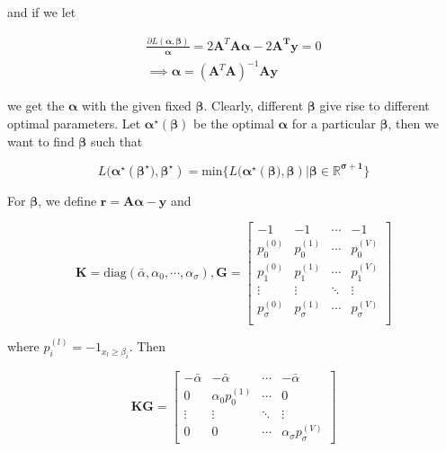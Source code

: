 and if we let 

\begin{equation}
\label{alpha_form}
	\begin{split}
		\frac{\partial L(\boldsymbol{\alpha}, \boldsymbol{\beta})}{\boldsymbol{\alpha}}=2\boldsymbol{A}^T\boldsymbol{A}\boldsymbol{\alpha}-2\boldsymbol{A^T}\boldsymbol{y}=0 \\ \implies 
		\boldsymbol{\alpha}=(\boldsymbol{A}^T\boldsymbol{A})^{-1}\boldsymbol{A}\boldsymbol{y}
	\end{split}
\end{equation}


we get the $\boldsymbol{\alpha}$ with the given fixed $\boldsymbol{\beta}$. Clearly, different $\boldsymbol{\beta}$ give rise to different optimal parameters. Let $\boldsymbol{\alpha^\star}(\boldsymbol{\beta})$ be the optimal $\boldsymbol{\alpha}$ for a particular $\boldsymbol{\beta}$, then we want to find $\boldsymbol{\beta}$ such that


\begin{equation}
	L(\boldsymbol{\alpha^\star}(\boldsymbol{\beta^\star)}, \boldsymbol{\beta^\star})=\text{min}\{L(\boldsymbol{\alpha^\star}(\boldsymbol{\beta)}, \boldsymbol{\beta}) | \boldsymbol{\beta\in\mathbb{R}^{\sigma+1}}\}
\end{equation}

For $\boldsymbol{\beta}$, we define $\boldsymbol{r}=\boldsymbol{A\alpha-y}$ and 

$$
\boldsymbol{K}=\text{diag}(\bar{\alpha},\alpha_0, \cdots, \alpha_\sigma), \boldsymbol{G}=\begin{bmatrix}
 -1 & -1 & \cdots & -1 \\
  p_0^{(0)} & p_0^{(1)} & \cdots & p_0^{(V)} \\
  p_1^{(0)} & p_1^{(1)} & \cdots & p_1^{(V)} \\
  \vdots & \vdots & \ddots & \vdots \\
  p_\sigma^{(0)} & p_\sigma^{(1)}& \cdots & p_\sigma^{(V)} \\
\end{bmatrix}
$$

where $p_i^{(l)}=-1_{x_l\geq \beta_i}$. Then

$$
\boldsymbol{KG}=\begin{bmatrix}
 -\bar{\alpha} & -\bar{\alpha} & \cdots & -\bar{\alpha} \\
 0 & \alpha_0p_0^{(1)} & \cdots  & 0 \\
 \vdots & \vdots & \ddots & \vdots \\
 0 & 0 & \cdots & \alpha_\sigma p_\sigma^{(V)}
\end{bmatrix}
$$

